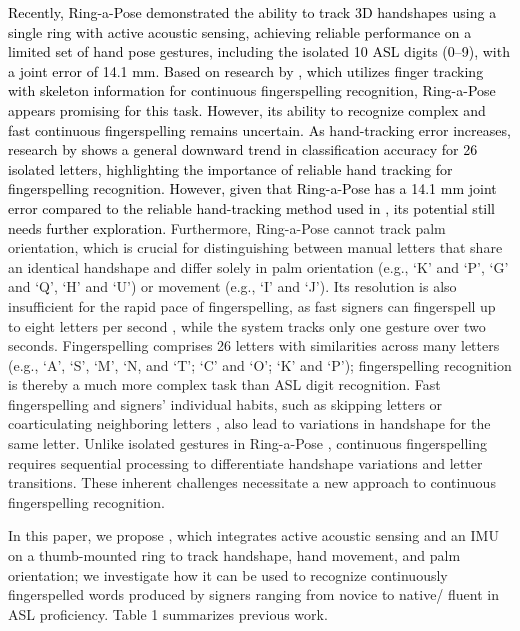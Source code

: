 \textcolor{black}{Recently, Ring-a-Pose \cite{yu2024ring} demonstrated the ability to track 3D handshapes using a single ring with active acoustic sensing, achieving reliable performance on a limited set of hand pose gestures, including the isolated 10 ASL digits (0–9), with a joint error of 14.1 mm.} \textcolor{black}{ Based on research by \cite{shi2018american, shi2019fingerspelling}, which utilizes finger tracking with skeleton information for continuous fingerspelling recognition, Ring-a-Pose appears promising for this task. However, its ability to recognize complex and fast continuous fingerspelling remains uncertain. As hand-tracking error increases, research by \cite{taylor2018real} shows a general downward trend in classification accuracy for 26 isolated letters, highlighting the importance of reliable hand tracking for fingerspelling recognition. However, given that Ring-a-Pose has a 14.1 mm joint error compared to the reliable hand-tracking method used in \cite{shi2018american, shi2019fingerspelling}, its potential still needs further exploration.} Furthermore, Ring-a-Pose \cite{yu2024ring} cannot track palm orientation, which is crucial for distinguishing between manual letters that share an identical handshape and differ solely in palm orientation (e.g., `K' and `P', `G' and `Q', `H' and `U') or movement (e.g., `I' and `J'). Its resolution is also insufficient for the rapid pace of fingerspelling, as fast signers can fingerspell up to eight letters per second \cite{hassan2023tap, hanson1982use, quinto2010rates, keane2016fingerspelling}, while the system tracks only one gesture over two seconds. Fingerspelling comprises 26 letters with similarities across many letters (e.g., `A', `S', `M', `N, and `T'; `C' and `O'; `K' and `P'); fingerspelling recognition is thereby a much more complex task than ASL digit recognition. Fast fingerspelling and signers' individual habits, such as skipping letters or coarticulating neighboring letters \cite{keane2015segmentation}, also lead to variations in handshape for the same letter. Unlike isolated gestures in Ring-a-Pose \cite{yu2024ring}, continuous fingerspelling requires sequential processing to differentiate handshape variations and letter transitions. These inherent challenges necessitate a new approach to continuous fingerspelling recognition.
 
 In this paper, we propose \theDevice{}, which integrates active acoustic sensing \cite{yu2024ring} and an IMU on a thumb-mounted ring to track handshape, hand movement, and palm orientation; we investigate how it can be used to recognize continuously fingerspelled words produced by signers ranging from novice to native/ fluent in ASL proficiency. Table 1 summarizes previous work. 
